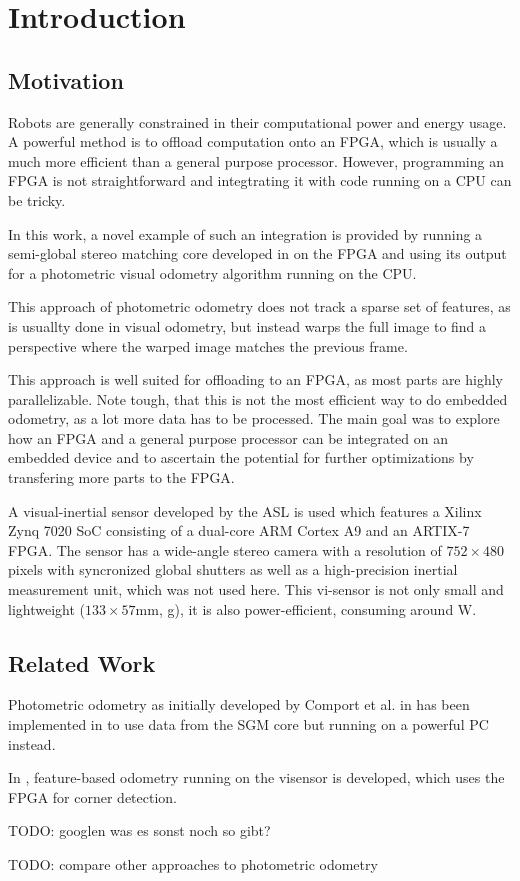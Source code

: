 \chapter{Introduction}
\label{sec:introduction}

\section{Motivation}
\label{sec:motivation}

Robots are generally constrained in their computational power and energy usage.
A powerful method is to offload computation onto an FPGA, which is usually
a much more efficient than a general purpose processor.  However, programming
an FPGA is not straightforward and integtrating it with code running on a CPU
can be tricky.

In this work, a novel example of such an integration is provided by running a
semi-global stereo matching \cite{hirschmuller2005sgm} core developed in
\cite{honegger2014sgmcore} on the FPGA and using its output for a photometric
visual odometry algorithm \cite{comport2007odometry} running on the CPU.

This approach of photometric odometry does not track a sparse set of features,
as is usuallty done in visual odometry, but instead warps the full image to
find a perspective where the warped image matches the previous frame.

This approach is well suited for offloading to an FPGA, as most parts are
highly parallelizable. Note tough, that this is not the most efficient way to do embedded odometry,
as a lot more data has to be processed. The main goal was to explore how an
FPGA and a general purpose processor can be integrated on an embedded device
and to ascertain the potential for further optimizations by transfering more
parts to the FPGA.

A visual-inertial sensor developed by the ASL \cite{nikolic2014synchronized} is
used which features a Xilinx Zynq 7020 SoC consisting of a dual-core ARM Cortex
A9 and an ARTIX-7 FPGA. The sensor has a wide-angle stereo camera with a
resolution of $752 \times 480$ pixels with syncronized global shutters as well
as a high-precision inertial measurement unit, which was not used here. This
vi-sensor is not only small and lightweight ($133 \times 57$mm, \unit[130]{g}),
it is also power-efficient, consuming around \unit[5]{W}.



\section{Related Work}
\label{sec:related_work}

Photometric odometry as initially developed by Comport et al. in
\cite{comport2007odometry} has been implemented in \cite{omaridenseodometry} to
use data from the SGM core but running on a powerful PC instead.

In \cite{marcin2014odometry}, feature-based odometry running on the visensor is
developed, which uses the FPGA for corner detection.



TODO: googlen was es sonst noch so gibt?

TODO: compare other approaches to photometric odometry
